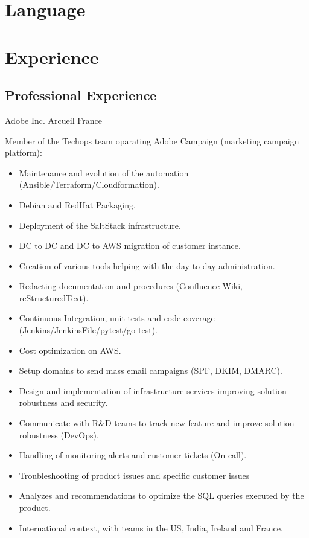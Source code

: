 \documentclass[10pt,a4paper,sans]{moderncv}        %
\begin{document}
\section{Language}

\section{Experience}

\subsection{Professional Experience}
              {Adobe Inc.}
              {Arcueil}
              {France}
              {Member of the Techops team oparating Adobe Campaign (marketing campaign platform):
                 \begin{itemize}
                 \item Maintenance and evolution of the automation (Ansible/Terraform/Cloudformation).
                 \item Debian and RedHat Packaging.
                 \item Deployment of the SaltStack infrastructure.
                 \item DC to DC and DC to AWS migration of customer instance.
                 \item Creation of various tools helping with the day to day administration.
                 \item Redacting documentation and procedures (Confluence Wiki, reStructuredText).
                 \item Continuous Integration, unit tests and code coverage (Jenkins/JenkinsFile/pytest/go test).
                 \item Cost optimization on AWS.
		 \item Setup domains to send mass email campaigns (SPF, DKIM, DMARC).
		 \item Design and implementation of infrastructure services improving solution robustness and security.
                 \item Communicate with R\&D teams to track new feature and improve solution robustness (DevOps).
		 \item Handling of monitoring alerts and customer tickets (On-call).
                 \item Troubleshooting of product issues and specific customer issues
                 \item Analyzes and recommendations to optimize the SQL queries executed by the product.
		 \item International context, with teams in the US, India, Ireland and France.
                 \end{itemize}
              }
\end{document}
